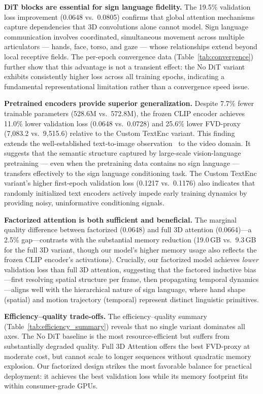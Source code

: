 \documentclass{ieeeaccess}
\begin{document}
\textbf{DiT blocks are essential for sign language fidelity.} The 19.5\% validation loss improvement (0.0648 vs.\ 0.0805) confirms that global attention mechanisms capture dependencies that 3D convolutions alone cannot model. Sign language communication involves coordinated, simultaneous movement across multiple articulators — hands, face, torso, and gaze — whose relationships extend beyond local receptive fields. The per-epoch convergence data (Table~\ref{tab:convergence}) further show that this advantage is not a transient effect: the No DiT variant exhibits consistently higher loss across all training epochs, indicating a fundamental representational limitation rather than a convergence speed issue.

\textbf{Pretrained encoders provide superior generalization.} Despite 7.7\% fewer trainable parameters (528.6M vs.\ 572.8M), the frozen CLIP encoder achieves 11.0\% lower validation loss (0.0648 vs.\ 0.0728) and 25.6\% lower FVD-proxy (7{,}083.2 vs.\ 9{,}515.6) relative to the Custom TextEnc variant. This finding extends the well-established text-to-image observation~\cite{rombach2022ldm} to the video domain. It suggests that the semantic structure captured by large-scale vision-language pretraining — even when the pretraining data contains no sign language — transfers effectively to the sign language conditioning task. The Custom TextEnc variant's higher first-epoch validation loss (0.1217 vs.\ 0.1176) also indicates that randomly initialized text encoders actively impede early training dynamics by providing noisy, uninformative conditioning signals.

\textbf{Factorized attention is both sufficient and beneficial.} The marginal quality difference between factorized (0.0648) and full 3D attention (0.0664)---a 2.5\% gap---contrasts with the substantial memory reduction (19.0\,GB vs.\ 9.3\,GB for the full 3D variant, though our model's higher memory usage also reflects the frozen CLIP encoder's activations). Crucially, our factorized model achieves \emph{lower} validation loss than full 3D attention, suggesting that the factored inductive bias---first resolving spatial structure per frame, then propagating temporal dynamics---aligns well with the hierarchical nature of sign language, where hand shape (spatial) and motion trajectory (temporal) represent distinct linguistic primitives.

\textbf{Efficiency--quality trade-offs.} The efficiency--quality summary (Table~\ref{tab:efficiency_summary}) reveals that no single variant dominates all axes. The No DiT baseline is the most resource-efficient but suffers from substantially degraded quality. Full 3D Attention offers the best FVD-proxy at moderate cost, but cannot scale to longer sequences without quadratic memory explosion. Our factorized design strikes the most favorable balance for practical deployment: it achieves the best validation loss while its memory footprint fits within consumer-grade GPUs.
\end{document}
